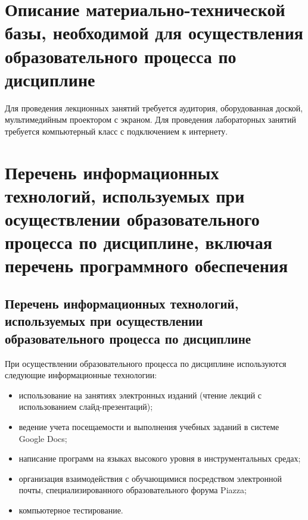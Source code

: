 \documentclass[a4paper,12pt]{article}
\begin{document}
\newpage
\section{Описание материально-технической базы, необходимой для осуществления образовательного процесса по дисциплине}
  
  
       Для проведения лекционных занятий требуется аудитория, оборудованная доской,  мультимедийным проектором с экраном. 
       Для проведения лабораторных занятий требуется компьютерный класс с подключением к интернету.
  
  


\section{Перечень информационных технологий, используемых при осуществлении образовательного процесса по дисциплине, включая перечень программного обеспечения
}

\subsection{Перечень информационных технологий, используемых при осуществлении образовательного процесса по дисциплине}

При осуществлении образовательного процесса по дисциплине используются следующие информационные технологии:
\begin{itemize}[nolistsep]
  
\item использование на занятиях электронных изданий (чтение лекций с использованием слайд-презентаций);
  
\item ведение учета посещаемости и выполнения учебных заданий в системе Google Docs;
  
\item написание программ на языках высокого уровня в инструментальных средах;
  
\item организация взаимодействия с обучающимися посредством электронной почты, специализированного образовательного форума Piazza;
  
\item компьютерное тестирование.
  
\end{itemize}
\end{document}
